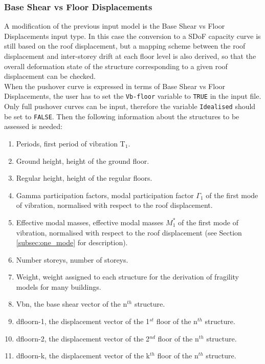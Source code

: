 \subsubsection{Base Shear vs Floor Displacements}
\label{subsubsec:VB-Dfloor}
A modification of the previous input model is the Base Shear vs Floor Displacements input type. In this case the conversion to a SDoF capacity curve is still based on the roof displacement, but a mapping scheme between the roof displacement and inter-storey drift at each floor level is also derived, so that the overall deformation state of the structure corresponding to a given roof displacement can be checked.\\
When the pushover curve is expressed in terms of Base Shear vs Floor Displacements, the user has to set the \verb=Vb-floor= variable to \verb=TRUE= in the input file. Only full pushover curves can be input, therefore the variable \verb=Idealised= should be set to \verb=FALSE=. Then the following information about the structures to be assessed is needed:\\

\begin{enumerate}
\item Periods, first period of vibration T$_1$.
\item Ground height, height of the ground floor.
\item Regular height, height of the regular floors.
\item Gamma participation factors, modal participation factor $\Gamma_1$ of the first mode of vibration, normalised with respect to the roof displacement.
\item Effective modal masses, effective modal masses $M_{1}^{*}$ of the first mode of vibration, normalised with respect to the roof displacement (see Section \ref{subsec:one_mode} for description).
\item Number storeys, number of storeys.
\item Weight, weight assigned to each structure for the derivation of fragility models for many buildings.
\item Vbn, the base shear vector of the n$^{th}$ structure.
\item dfloorn-1, the displacement vector of the 1$^{st}$ floor of the n$^{th}$ structure.
\item dfloorn-2, the displacement vector of the 2$^{nd}$ floor of the n$^{th}$ structure.
\item dfloorn-k, the displacement vector of the k$^{th}$ floor of the n$^{th}$ structure. \\
\end{enumerate}

